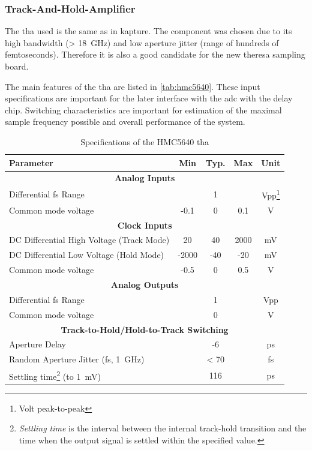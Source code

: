 \subsubsection*{Track-And-Hold-Amplifier}
The \gls{tha} used is the same as in \gls{kapture}. 
The component was chosen due to its high bandwidth (> \SI{18}{\GHz}) and low aperture jitter (range of hundreds of femtoseconds). \cite{caselle2013} 
Therefore it is also a good candidate for the new \gls{theresa} sampling board.


The main features of the \gls{tha} are listed in \autoref{tab:hmc5640}.
These input specifications are important for the later interface with the \gls{adc} with the delay chip.
Switching characteristics are important for estimation of the maximal sample frequency possible and overall performance of the system.
\begin{table}[tb]
	\caption[HMC5640 Characteristics]{Specifications of the HMC5640 \gls{tha}}
	\label{tab:hmc5640}
	\begin{minipage}{\textwidth}
		\centering
		\begin{tabularx}{\textwidth}{Xcccc}
			\toprule
			\textbf{Parameter} & \textbf{Min} & \textbf{Typ.} & \textbf{Max} & \textbf{Unit}\\
			\midrule
			\multicolumn{5}{c}{\textbf{Analog Inputs}}  \\
			Differential \gls{fs} Range & & 1 & & Vpp\footnote{Volt peak-to-peak}\\
			Common mode voltage & -0.1 & 0 & 0.1 & V\\[0.3cm]
		    \multicolumn{5}{c}{\textbf{Clock Inputs}}  \\
			DC Differential High Voltage (Track Mode) & 20 & 40 & 2000 & mV\\
			DC Differential Low Voltage (Hold Mode) & -2000 & -40 & -20 & mV\\
			Common mode voltage & -0.5 & 0 & 0.5 & V\\[0.3cm]
		    \multicolumn{5}{c}{\textbf{Analog Outputs}}  \\
			Differential \gls{fs} Range &  & 1 && Vpp\\
			Common mode voltage & & 0 & & V\\[0.3cm]
			\multicolumn{5}{c}{\textbf{Track-to-Hold/Hold-to-Track Switching}} \\
			Aperture Delay & & -6 &  & ps\\
			Random Aperture Jitter (\gls{fs}, \SI{1}{\giga \hertz}) & & < 70 & & fs\\
			Settling time\footnote{\textit{Settling time} is the interval between the internal track-hold transition and the time when the output signal is settled within the specified value.} (to \SI{1}{\milli \volt}) &	&  116 & & ps \\
			\bottomrule
		\end{tabularx}
	\end{minipage}
\end{table}

